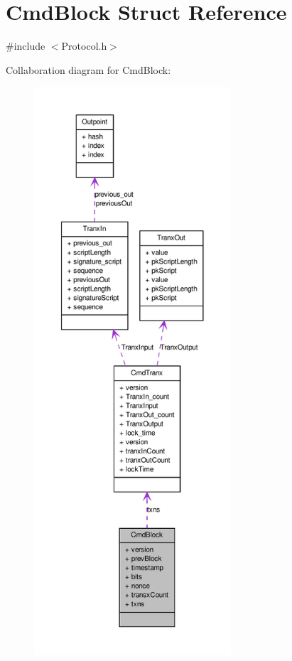 \hypertarget{struct_cmd_block}{
\section{CmdBlock Struct Reference}
\label{struct_cmd_block}
}


{\ttfamily \#include $<$Protocol.h$>$}



Collaboration diagram for CmdBlock:\nopagebreak
\begin{figure}[H]
\begin{center}
\leavevmode
\includegraphics[height=600pt]{struct_cmd_block__coll__graph}
\end{center}
\end{figure}

